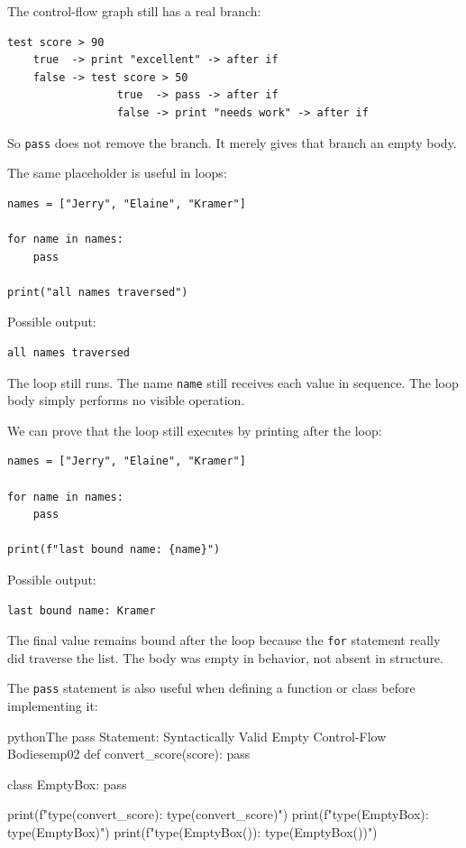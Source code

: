 The control-flow graph still has a real branch:

\begin{verbatim}
test score > 90
    true  -> print "excellent" -> after if
    false -> test score > 50
                 true  -> pass -> after if
                 false -> print "needs work" -> after if
\end{verbatim}

So \texttt{pass} does not remove the branch. It merely gives that branch an empty body.

The same placeholder is useful in loops:

\begin{verbatim}
names = ["Jerry", "Elaine", "Kramer"]

for name in names:
    pass

print("all names traversed")
\end{verbatim}

Possible output:

\begin{verbatim}
all names traversed
\end{verbatim}

The loop still runs. The name \texttt{name} still receives each value in sequence. The loop body simply performs no visible operation.

We can prove that the loop still executes by printing after the loop:

\begin{verbatim}
names = ["Jerry", "Elaine", "Kramer"]

for name in names:
    pass

print(f"last bound name: {name}")
\end{verbatim}

Possible output:

\begin{verbatim}
last bound name: Kramer
\end{verbatim}

The final value remains bound after the loop because the \texttt{for} statement really did traverse the list. The body was empty in behavior, not absent in structure.

The \texttt{pass} statement is also useful when defining a function or class before implementing it:

\begin{codebox}[]{python}{The pass Statement: Syntactically Valid Empty Control-Flow Bodies}{emp02}
def convert_score(score):
    pass

class EmptyBox:
    pass

print(f"type(convert_score): {type(convert_score)}")
print(f"type(EmptyBox): {type(EmptyBox)}")
print(f"type(EmptyBox()): {type(EmptyBox())}")
\end{codebox}


